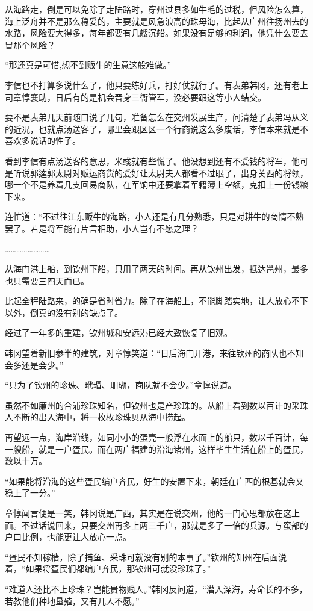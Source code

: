 从海路走，倒是可以免除了走陆路时，穿州过县多如牛毛的过税，但风险怎么算，海上泛舟并不是那么稳妥的，主要就是风急浪高的珠母海，比起从广州往扬州去的水路，风险要大得多，每年都要有几艘沉船。如果没有足够的利润，他凭什么要去冒那个风险？

“那还真是可惜,想不到贩牛的生意这般难做。”

李信也不打算多说什么了，他只要练好兵，打好仗就行了。有表弟韩冈，还有老上司章惇襄助，日后有的是机会晋身三衙管军，没必要跟这等小人结交。

要不是表弟几天前随口说了几句，准备怎么在交州发展生产，问清楚了表弟冯从义的近况，也就点汤送客了，哪里会跟区区一个行商说这么多废话，李信本来就是不喜欢多说话的性子。

看到李信有点汤送客的意思，米彧就有些慌了。他没想到还有不爱钱的将军，他可是听说郭逵郭太尉对贩运商货的爱好让太尉夫人都看不过眼了，出身关西的将领，哪一个不是养着几支回易商队，在军饷中还要拿着军籍簿上空额，克扣上一份钱粮下来。

连忙道：“不过往江东贩牛的海路，小人还是有几分熟悉，只是对耕牛的商情不熟罢了。若是将军能有片言相助，小人岂有不愿之理？

……………………

从海门港上船，到钦州下船，只用了两天的时间。再从钦州出发，抵达邕州，最多也只需要三四天而已。

比起全程陆路来，的确是省时省力。除了在海船上，不能脚踏实地，让人放心不下以外，倒真的没有别的缺点了。

经过了一年多的重建，钦州城和安远港已经大致恢复了旧观。

韩冈望着新旧参半的建筑，对章惇笑道：“日后海门开港，来往钦州的商队也不知会多还是会少。”

“只为了钦州的珍珠、玳瑁、珊瑚，商队就不会少。”章惇说道。

虽然不如廉州的合浦珍珠知名，但钦州也是产珍珠的。从船上看到数以百计的采珠人不断的出入海中，将一枚枚珍珠贝从海中捞起。

再望远一点，海岸沿线，如同小小的蛋壳一般浮在水面上的船只，数以千百计，每一艘船，就是一户疍民。而在两广福建的沿海诸州，这样毕生生活在船上的疍民，数以十万。

“如果能将沿海的这些疍民编户齐民，好生的安置下来，朝廷在广西的根基就会又稳上了一分。”

章惇闻言便是一笑，韩冈说是广西，其实是在说交州，他的一门心思都放在这上面。不过话说回来，只要交州再多上两三千户，那就是多了一倍的兵源。与蛮部的户口比例，也能更让人放心一点。

“疍民不知稼樯，除了捕鱼、采珠可就没有别的本事了。”钦州的知州在后面说着，“如果将疍民们都编户齐民，那钦州可就没珍珠了。”

“难道人还比不上珍珠？岂能贵物贱人。”韩冈反问道，“潜入深海，寿命长的不多，若教他们种地垦殖，又有几人不愿。”

